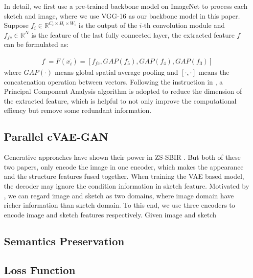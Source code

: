 \documentclass[10pt,twocolumn,letterpaper]{article}
\begin{document}
In detail, we first use a pre-trained backbone model on ImageNet \cite{deng2009imagenet} to process each sketch and image, where we use VGG-16 as our backbone model in this paper. Suppose $f_i \in \mathbb{R}^{C_i \times H_i \times W_i}$ is the output of the $i$-th convolution module and $f_{fc} \in \mathbb{R}^{N}$ is the feature of the last fully connected layer, the extracted feature $f^{\cdot}$ can be formulated as:

\begin{align}
f^{\cdot} = F(x_i^{\cdot}) = [f_{fc}, GAP(f_5), GAP(f_4), GAP(f_3)]
\end{align}
where $GAP(\cdot)$ means global spatial average pooling and $[\cdot,\cdot]$ means the concatenation operation between vectors. Following the instruction in \cite{wang2019stacked}, a Principal Component Analysis algorithm is adopted to reduce the dimension of the extracted feature, which is helpful to not only improve the computational effiency but remove some redundant information.

\subsection{Parallel cVAE-GAN} \label{3.3}
Generative approaches have shown their power in ZS-SBIR \cite{wang2019stacked,yelamarthi2018zero}. But both of these two papers, only encode the image in one encoder, which makes the appearance and the structure features fused together. When training the VAE based model, the decoder may ignore the condition information in sketch feature. Motivated by \cite{zhu2017toward}, we can regard image and sketch as two domains, where image domain have richer information than sketch domain. To this end, we use three encoders to encode image and sketch features respectively. Given image and sketch 

\subsection{Semantics Preservation} \label{3.4}

\subsection{Loss Function} \label{3.5}



\end{document}
